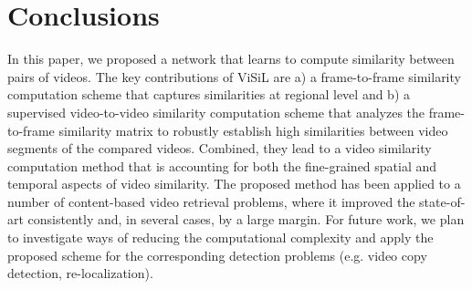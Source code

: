 \documentclass[10pt,twocolumn,letterpaper]{article}
\begin{document}
\setcounter{table}{7}
\begin{table}[t]
  \centering
  \caption {mAP comparison of three ViSiL setups and four publicly available retrieval methods on ActivityNet based on the reorganization from \cite{feng2018}.}
  \label{tab:map_depth}
\end{table}


\section{Conclusions}

In this paper, we proposed a network that learns to compute similarity between pairs of videos. The key contributions of ViSiL are a) a frame-to-frame similarity computation scheme that captures similarities at regional level and b) a supervised video-to-video similarity computation scheme that analyzes the frame-to-frame similarity matrix to robustly establish high similarities between video segments of the compared videos. Combined, they lead to a video similarity computation method that is accounting for both the fine-grained spatial and temporal aspects of video similarity. The proposed method has been applied to a number of content-based video retrieval problems, where it improved the state-of-art consistently and, in several cases, by a large margin. For future work, we plan to investigate ways of reducing the computational complexity and apply the proposed scheme for the corresponding detection problems (e.g. video copy detection, re-localization). 
\end{document}
